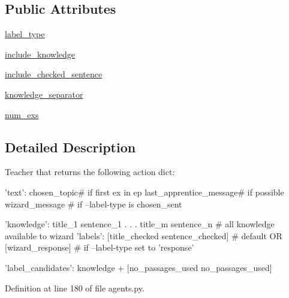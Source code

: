 \subsection*{Public Attributes}
\begin{DoxyCompactItemize}
\item 
\hyperlink{classparlai_1_1tasks_1_1wizard__of__wikipedia_1_1agents_1_1WizardDialogKnowledgeTeacher_a90ee3b140e3c996f086dfd673bbc57b3}{label\+\_\+type}
\item 
\hyperlink{classparlai_1_1tasks_1_1wizard__of__wikipedia_1_1agents_1_1WizardDialogKnowledgeTeacher_a2b468dc6d3e2072ba8a8b8fae0819e34}{include\+\_\+knowledge}
\item 
\hyperlink{classparlai_1_1tasks_1_1wizard__of__wikipedia_1_1agents_1_1WizardDialogKnowledgeTeacher_ac8ea6c9184d7ca02160700ed481f480c}{include\+\_\+checked\+\_\+sentence}
\item 
\hyperlink{classparlai_1_1tasks_1_1wizard__of__wikipedia_1_1agents_1_1WizardDialogKnowledgeTeacher_a6b730a4589d91298fd7b54aa0c355046}{knowledge\+\_\+separator}
\item 
\hyperlink{classparlai_1_1tasks_1_1wizard__of__wikipedia_1_1agents_1_1WizardDialogKnowledgeTeacher_a263ebbfdc445fd19bc664ebf2e72ab30}{num\+\_\+exs}
\end{DoxyCompactItemize}


\subsection{Detailed Description}
\begin{DoxyVerb}    Teacher that returns the following action dict:
    {
        'text': chosen_topic\n # if first ex in ep
                last_apprentice_message\n # if possible
                wizard_message # if --label-type is chosen_sent

        'knowledge': title_1 sentence_1\n
                            .
                            .
                            .
                     title_m sentence_n # all knowledge available to wizard
        'labels': [title_checked sentence_checked] # default
                                    OR
                  [wizard_response] # if --label-type set to 'response'

        'label_candidates': knowledge + [no_passages_used no_passages_used]
    }
\end{DoxyVerb}
 

Definition at line 180 of file agents.\+py.



